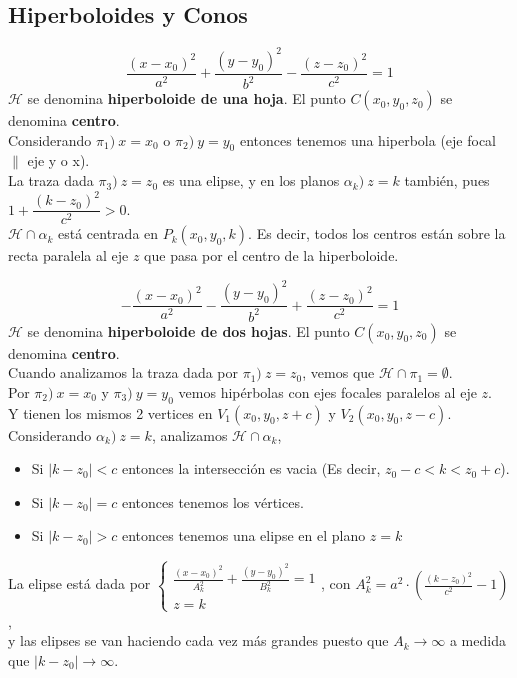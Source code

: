 \documentclass[11pt,a4paper]{article}
\begin{document}
\subsection{Hiperboloides y Conos}
$$\frac{(x-x_0)^2}{a^2} + \frac{(y-y_0)^2}{b^2} - \frac{(z-z_0)^2}{c^2} = 1$$
$\mathcal{H}$ se denomina \textbf{hiperboloide de una hoja}. El punto $C(x_0, y_0, z_0)$ se denomina \textbf{centro}.\\
Considerando $\pi_1)\ x = x_0$ o $\pi_2)\ y = y_0$ entonces tenemos una hiperbola (eje focal $\parallel$ eje y o x).\\
La traza dada $\pi_3)\ z = z_0$ es una elipse, y en los planos $\alpha_k)\ z = k$ tambi\'en, pues $1+\dfrac{(k - z_0)^2}{c^2} > 0$.\\
$\mathcal{H} \cap \alpha_k$ est\'a centrada en $P_k(x_0, y_0, k)$. Es decir, todos los centros est\'an sobre la recta paralela al eje $z$ que pasa por el centro de la hiperboloide.

$$- \frac{(x-x_0)^2}{a^2} - \frac{(y-y_0)^2}{b^2} + \frac{(z-z_0)^2}{c^2} = 1$$
$\mathcal{H}$ se denomina \textbf{hiperboloide de dos hojas}. El punto $C(x_0, y_0, z_0)$ se denomina \textbf{centro}.\\
Cuando analizamos la traza dada por $\pi_1)\ z = z_0$, vemos que $\mathcal{H} \cap \pi_1 = \emptyset$.\\
Por $\pi_2)\ x = x_0$ y $\pi_3)\ y = y_0$ vemos hip\'erbolas con ejes focales paralelos al eje $z$.\\
Y tienen los mismos 2 vertices en $V_1(x_0, y_0, z+c)$ y $V_2(x_0, y_0, z-c)$.\\
Considerando $\alpha_k)\ z = k$, analizamos $\mathcal{H} \cap \alpha_k$,
\begin{itemize}
\itemsep-0.3em
\item Si $|k - z_0| < c$ entonces la intersecci\'on es vacia (Es decir, $z_0 - c < k < z_0 + c$).
\item Si $|k - z_0| = c$ entonces tenemos los v\'ertices.
\item Si $|k - z_0| > c$ entonces tenemos una elipse en el plano $z = k$
\end{itemize}
La elipse est\'a dada por $\left\{ \begin{array}{l} \frac{(x-x_0)^2}{A_k^2} + \frac{(y-y_0)^2}{B_k^2} = 1 \\ z = k \end{array} \right.$, con $A_k^2 = a^2 \cdot \left( \frac{(k - z_0)^2}{c^2} - 1 \right)$,\\
y las elipses se van haciendo cada vez m\'as grandes puesto que $A_k \rightarrow \infty$ a medida que $|k-z_0| \rightarrow \infty$.
\end{document}
